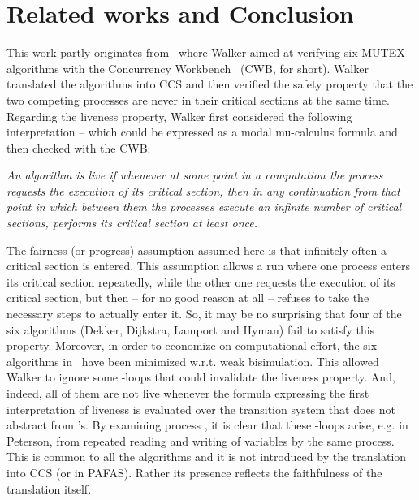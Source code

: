 \documentclass[copyright,creativecommons]{eptcs}
\begin{document}
\section{Related works and Conclusion} \label{sec:walker}
This work partly originates from~\cite{Walker89} where Walker aimed at
verifying six MUTEX algorithms with the Concurrency
Workbench~\cite{CleavelandPS89} (CWB, for short). 
Walker translated the algorithms into CCS and then verified the safety
property that the two competing processes are never in their critical
sections at the same time. Regarding the liveness property, Walker first
considered the following interpretation -- which could be expressed as a
modal mu-calculus formula and then checked with the CWB:
\begin{center}
\begin{minipage}{15.5cm}
\small
\em
An algorithm is live if whenever at some point in a computation the
process  requests the execution of its critical section, then in
any continuation from that point in which between them the processes
execute an infinite number of critical sections,  performs its
critical section at least once. 
\end{minipage}
\end{center}
The fairness (or progress) assumption assumed here is that infinitely often
a critical section is entered. This assumption allows a run where one
process enters its critical section repeatedly, while the other one
requests the execution of its critical section, but then -- for no good
reason at all -- refuses to take the necessary steps to actually enter it.
So, it may be no surprising that four of the six algorithms (Dekker,
Dijkstra, Lamport and Hyman) fail to satisfy this property. Moreover, in
order to economize on computational effort, the six algorithms
in~\cite{Walker89} have been minimized w.r.t. weak bisimulation. This
allowed Walker to ignore some -loops that could invalidate the
liveness property. And, indeed, all of them are not live whenever
the formula expressing the first interpretation of liveness is evaluated
over the transition system that does not abstract from 's. By
examining process , it is clear that these -loops arise,
e.g. in Peterson, from repeated reading and writing of variables by the
same process. This is common to all the algorithms and it is not introduced
by the translation into CCS (or in PAFAS). Rather its presence reflects the
faithfulness of the translation itself. 
\end{document}
